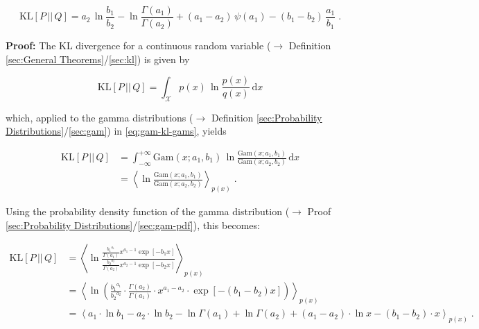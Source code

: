 \documentclass[a4paper,12pt,twoside]{book}
\begin{document}
\begin{equation} \label{eq:gam-kl-gam-KL}
\mathrm{KL}[P\,||\,Q] = a_2 \, \ln \frac{b_1}{b_2} - \ln \frac{\Gamma(a_1)}{\Gamma(a_2)} + (a_1 - a_2) \, \psi(a_1) - (b_1 - b_2) \, \frac{a_1}{b_1} \; .
\end{equation}


\vspace{1em}
\textbf{Proof:} The KL divergence for a continuous random variable ($\rightarrow$ Definition \ref{sec:General Theorems}/\ref{sec:kl}) is given by 

\begin{equation} \label{eq:gam-kl-KL-cont}
\mathrm{KL}[P\,||\,Q] = \int_{\mathcal{X}} p(x) \, \ln \frac{p(x)}{q(x)} \, \mathrm{d}x
\end{equation}

which, applied to the gamma distributions ($\rightarrow$ Definition \ref{sec:Probability Distributions}/\ref{sec:gam}) in \eqref{eq:gam-kl-gams}, yields

\begin{equation} \label{eq:gam-kl-gam-KL-s1}
\begin{split}
\mathrm{KL}[P\,||\,Q] &= \int_{-\infty}^{+\infty} \mathrm{Gam}(x; a_1, b_1) \, \ln \frac{\mathrm{Gam}(x; a_1, b_1)}{\mathrm{Gam}(x; a_2, b_2)} \, \mathrm{d}x \\
&= \left\langle \ln \frac{\mathrm{Gam}(x; a_1, b_1)}{\mathrm{Gam}(x; a_2, b_2)} \right\rangle_{p(x)} \; .
\end{split}
\end{equation}

Using the probability density function of the gamma distribution ($\rightarrow$ Proof \ref{sec:Probability Distributions}/\ref{sec:gam-pdf}), this becomes:

\begin{equation} \label{eq:gam-kl-gam-KL-s2}
\begin{split}
\mathrm{KL}[P\,||\,Q] &= \left\langle \ln \frac{ \frac{ {b_1}^{a_1}}{\Gamma(a_1)} x^{a_1-1} \exp[-b_1 x] }{ \frac{ {b_2}^{a_2}}{\Gamma(a_2)} x^{a_2-1} \exp[-b_2 x] } \right\rangle_{p(x)} \\
&= \left\langle \ln \left( \frac{ {b_1}^{a_1}}{ {b_2}^{a_2}} \cdot \frac{\Gamma(a_2)}{\Gamma(a_1)} \cdot x^{a_1-a_2} \cdot \exp[-(b_1-b_2) x] \right) \right\rangle_{p(x)} \\
&= \left\langle a_1 \cdot \ln b_1 - a_2 \cdot \ln b_2 - \ln \Gamma(a_1) + \ln \Gamma(a_2) + (a_1-a_2) \cdot \ln x - (b_1-b_2) \cdot x \right\rangle_{p(x)} \; .
\end{split}
\end{equation}
\end{document}
